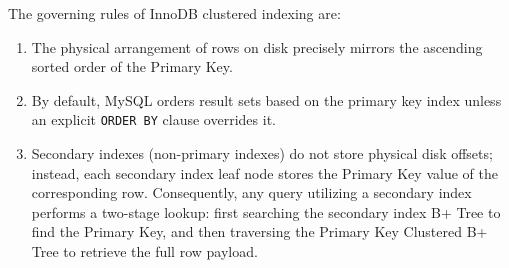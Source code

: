 \documentclass[10pt,journal,compsoc,onecolumn]{IEEEtran}
\begin{document}
The governing rules of InnoDB clustered indexing are:
\begin{enumerate}
    \item The physical arrangement of rows on disk precisely mirrors the ascending sorted order of the Primary Key.
    \item By default, MySQL orders result sets based on the primary key index unless an explicit \texttt{ORDER BY} clause overrides it.
    \item Secondary indexes (non-primary indexes) do not store physical disk offsets; instead, each secondary index leaf node stores the Primary Key value of the corresponding row. Consequently, any query utilizing a secondary index performs a two-stage lookup: first searching the secondary index B+ Tree to find the Primary Key, and then traversing the Primary Key Clustered B+ Tree to retrieve the full row payload.
\end{enumerate}
\end{document}

